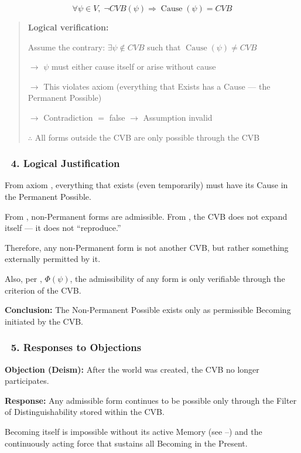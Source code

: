 \documentclass[12pt]{article}
\begin{document}
\[
\forall \psi \in V, \; \neg CVB(\psi) \Rightarrow \operatorname{Cause}(\psi) = CVB
\]

\begin{quote}
\textbf{Logical verification:}

Assume the contrary: $\exists \psi \notin CVB$ such that $\operatorname{Cause}(\psi) \neq CVB$

$\rightarrow$ $\psi$ must either cause itself or arise without cause

$\rightarrow$ This violates axiom \text{[6]} (everything that Exists has a Cause — the Permanent Possible)

$\rightarrow$ Contradiction $=$ false $\rightarrow$ Assumption invalid

$\therefore$ All forms outside the CVB are only possible through the CVB
\end{quote}

\subsubsection*{🔹 4. Logical Justification}

From axiom \text{[6]}, everything that exists (even temporarily) must have its Cause in the Permanent Possible.

From \text{[4]}, non-Permanent forms are admissible. From \text{[13]}, the CVB does not expand itself — it does not ``reproduce.''

Therefore, any non-Permanent form is not another CVB, but rather something externally permitted by it.

Also, per \text{[11.1.1]}, $\Phi(\psi)$, the admissibility of any form is only verifiable through the criterion of the CVB.

\textbf{Conclusion:} The Non-Permanent Possible exists only as permissible Becoming initiated by the CVB.

\subsubsection*{🔹 5. Responses to Objections}

\textbf{Objection (Deism):} After the world was created, the CVB no longer participates.

\textbf{Response:} Any admissible form continues to be possible only through the Filter of Distinguishability stored within the CVB.

Becoming itself is impossible without its active Memory (see \text{[10.3.7]}–\text{[10.3.8]}) and the continuously acting force that sustains all Becoming in the Present.
\end{document}
